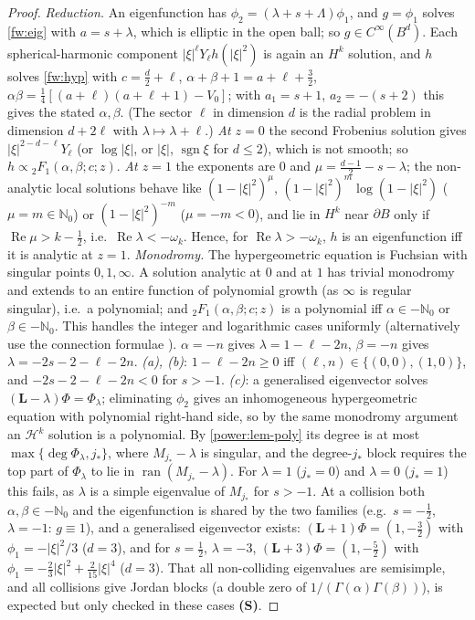 \begin{proof}
\emph{Reduction.} An eigenfunction has $\phi_2=(\lambda+s+\Lambda)\phi_1$, and
$g=\phi_1$ solves \eqref{fw:eig} with $a=s+\lambda$, which is elliptic in the open
ball; so $g\in C^\infty(B^d)$. Each spherical-harmonic component
$|\xi|^\ell Y_\ell h(|\xi|^2)$ is again an $H^k$ solution, and $h$ solves
\eqref{fw:hyp} with $c=\frac d2+\ell$, $\alpha+\beta+1=a+\ell+\frac32$,
$\alpha\beta=\frac14[(a+\ell)(a+\ell+1)-V_0]$; with $a_1=s+1$, $a_2=-(s+2)$ this
gives the stated $\alpha,\beta$. (The sector $\ell$ in dimension $d$ is the radial
problem in dimension $d+2\ell$ with $\lambda\mapsto\lambda+\ell$.)
\emph{At $z=0$} the second Frobenius solution gives $|\xi|^{2-d-\ell}Y_\ell$ (or
$\log|\xi|$, or $|\xi|$, $\operatorname{sgn}\xi$ for $d\le2$), which is not smooth; so
$h\propto{}_2F_1(\alpha,\beta;c;z)$.
\emph{At $z=1$} the exponents are $0$ and $\mu=\frac{d-1}{2}-s-\lambda$; the non-analytic
local solutions behave like $(1-|\xi|^2)^\mu$, $(1-|\xi|^2)^m\log(1-|\xi|^2)$ ($\mu=m\in\mathbb
N_0$) or $(1-|\xi|^2)^{-m}$ ($\mu=-m<0$), and lie in $H^k$ near $\partial B$ only if
$\operatorname{Re}\mu>k-\frac12$, i.e.\ $\operatorname{Re}\lambda<-\omega_k$. Hence, for
$\operatorname{Re}\lambda>-\omega_k$, $h$ is an eigenfunction iff it is analytic at $z=1$.
\emph{Monodromy.} The hypergeometric equation is Fuchsian with singular points
$0,1,\infty$. A solution analytic at $0$ and at $1$ has trivial monodromy and
extends to an entire function of polynomial growth (as $\infty$ is regular
singular), i.e.\ a polynomial; and ${}_2F_1(\alpha,\beta;c;z)$ is a polynomial iff
$\alpha\in-\mathbb N_0$ or $\beta\in-\mathbb N_0$. This handles the integer and logarithmic
cases uniformly (alternatively use the connection formulae
\cite[\S15.8]{OlverEtAl2010}). $\alpha=-n$ gives $\lambda=1-\ell-2n$, $\beta=-n$ gives
$\lambda=-2s-2-\ell-2n$.
\emph{(a), (b)}: $1-\ell-2n\ge0$ iff $(\ell,n)\in\{(0,0),(1,0)\}$, and
$-2s-2-\ell-2n<0$ for $s>-1$.
\emph{(c)}: a generalised eigenvector solves $(\mathbf L-\lambda)\Phi=\Phi_\lambda$;
eliminating $\phi_2$ gives an inhomogeneous hypergeometric equation with
polynomial right-hand side, so by the same monodromy argument an $\mathcal H^k$
solution is a polynomial. By \cref{power:lem-poly} its degree is at most
$\max\{\deg\Phi_\lambda,j_*\}$, where $M_{j_*}-\lambda$ is singular, and the
degree-$j_*$ block requires the top part of $\Phi_\lambda$ to lie in
$\operatorname{ran}(M_{j_*}-\lambda)$. For $\lambda=1$ ($j_*=0$) and $\lambda=0$ ($j_*=1$) this
fails, as $\lambda$ is a simple eigenvalue of $M_{j_*}$ for $s>-1$. At a collision
both $\alpha,\beta\in-\mathbb N_0$ and the eigenfunction is shared by the two families
(e.g.\ $s=-\frac12$, $\lambda=-1$: $g\equiv1$), and a generalised eigenvector exists:
$(\mathbf L+1)\Phi=(1,-\frac32)$ with $\phi_1=-|\xi|^2/3$ ($d=3$), and for $s=\frac12$,
$\lambda=-3$, $(\mathbf L+3)\Phi=(1,-\frac52)$ with $\phi_1=-\frac23|\xi|^2+\frac2{15}|\xi|^4$ ($d=3$). That all non-colliding eigenvalues
are semisimple, and all collisions give Jordan blocks (a double zero of
$1/(\Gamma(\alpha)\Gamma(\beta))$), is expected but only checked in these cases
\textbf{(S)}.
\end{proof}

